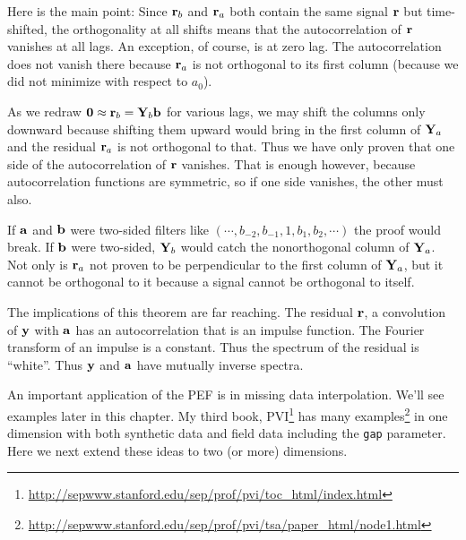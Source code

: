 \par
Here is the main point:
Since $\bold r_b$ and $\bold r_a$ both contain the same signal $\bold r$
but time-shifted,
the orthogonality at all shifts means that the autocorrelation
of $\bold r$
vanishes at all lags.
An exception, of course, is at zero lag.
The autocorrelation does not vanish there
because $\bold r_a$ is not orthogonal to its first column
(because we did not minimize with respect to $a_0$).
\par
As we redraw
$\bold 0\approx\bold r_b =\bold Y_b\bold b$
for various lags,
we may shift the columns only downward
because shifting them upward would bring in the first column
of $\bold Y_a$ and the residual $\bold r_a$ is not orthogonal to that.
Thus we have only proven that
one side of the autocorrelation of $\bold r$ vanishes.
That is enough however, because autocorrelation functions
are symmetric, so if one side vanishes, the other must also.
\par
If $\bold a$ and $\bold b$ were two-sided
filters like $(\cdots ,b_{-2}, b_{-1}, 1, b_1, b_2, \cdots)$
the proof would break.
If $\bold b$ were two-sided, $\bold Y_b$ would catch the 
nonorthogonal column of $\bold Y_a$.
Not only is $\bold r_a$ not proven to be perpendicular
to the first column of $\bold Y_a$,
but it cannot be orthogonal to it
because a signal cannot be orthogonal to itself.
\par
The implications of this theorem are far reaching.
The residual $\bold r$,
a convolution of $\bold y$
with $\bold a$ has an
autocorrelation that is an impulse function.
The Fourier transform of an impulse is a constant.
Thus the spectrum of the residual is ``white''.
Thus $\bold y$ and $\bold a$ have mutually inverse spectra.
\par
{}

\par
An important application of the PEF
is in missing data interpolation.
We'll see examples later in this chapter.
My third book,
PVI\footnote{
	\url{http://sepwww.stanford.edu/sep/prof/pvi/toc_html/index.html}
	}
has many
examples\footnote{
	\url{http://sepwww.stanford.edu/sep/prof/pvi/tsa/paper_html/node1.html}
	}
in one dimension with both synthetic data and field data
including the \texttt{gap} parameter.
Here we next extend these ideas to two (or more) dimensions.



